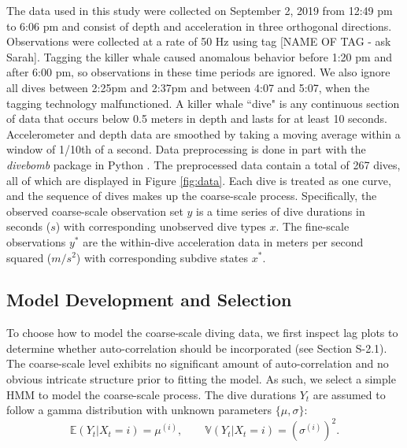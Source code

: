 The data used in this study were collected on September 2, 2019 from 12:49 pm to 6:06 pm and consist of depth and acceleration in three orthogonal directions. Observations were collected at a rate of 50 Hz using tag [NAME OF TAG - ask Sarah]. Tagging the killer whale caused anomalous behavior before 1:20 pm and after 6:00 pm, so observations in these time periods are ignored. We also ignore all dives between 2:25pm and 2:37pm and between 4:07 and 5:07, when the tagging technology malfunctioned. A killer whale ``dive" is any continuous section of data that occurs below 0.5 meters in depth and lasts for at least 10 seconds. Accelerometer and depth data are smoothed by taking a moving average within a window of 1/10th of a second. Data preprocessing is done in part with the \textit{divebomb} package in Python \citep{Nunes:2018}. The preprocessed data contain a total of 267 dives, all of which are displayed in Figure \ref{fig:data}. Each dive is treated as one curve, and the sequence of dives makes up the coarse-scale process. Specifically, the observed coarse-scale observation set $y$ is a time series of dive durations in seconds ($s$) with corresponding unobserved dive types $x$. The fine-scale observations $y^*$ are the within-dive acceleration data in meters per second squared ($m/s^2$) with corresponding subdive states $x^*$.

\subsection{Model Development and Selection}

To choose how to model the coarse-scale diving data, we first inspect lag plots to determine whether auto-correlation should be incorporated (see Section S-2.1). The coarse-scale level exhibits no significant amount of auto-correlation and no obvious intricate structure prior to fitting the model. As such, we select a simple HMM to model the coarse-scale process. The dive durations $Y_t$ are assumed to follow a gamma distribution with unknown parameters $\{\mu,\sigma\}$:
%
$$\mathbb{E}(Y_t|X_t = i) = \mu^{(i)}, \qquad \mathbb{V}(Y_t|X_t = i) = \left(\sigma^{(i)}\right)^2.$$

